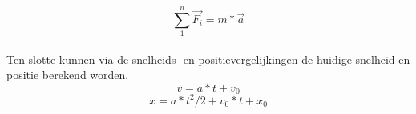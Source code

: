 \begin{equation*}
	\sum_{1}^{n} \vec{F_i} = m * \vec{a} 
\end{equation*}
\\
Ten slotte kunnen via de snelheids- en positievergelijkingen de huidige snelheid en positie berekend worden. \\
\begin{equation*}
v = a*t + v_0
\end{equation*} 
\begin{equation*}
x = a*t^{2}/2 + v_0*t + x_0
\end{equation*}


